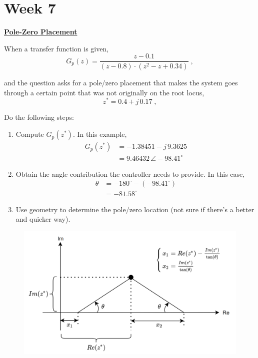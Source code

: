 \section{Week 7}
\textbf{\underline{Pole-Zero Placement}}

When a transfer function is given,
\begin{equation*}
    G_p (z) = \frac{z-0.1}{(z-0.8)\cdot (z^2-z+0.34)} \; ,
\end{equation*}

and the question asks for a pole/zero placement that makes the system goes through a certain point that was not originally on the root locus,
\begin{equation*}
    z^* = 0.4+j\,0.17 \; ,
\end{equation*}

Do the following steps:
\begin{enumerate}
    \item Compute $G_p(z^*)$. In this example,
    \begin{align*}
        G_p(z^*) &= -1.38451 - j\, 9.3625 \\
        &= 9.46432 \, \angle -98.41^{\circ} 
    \end{align*}
    \item Obtain the angle contribution the controller needs to provide. In this case,
    \begin{align*}
        \theta &= -180^{\circ} - (-98.41^{\circ}) \\
        &= -81.58^{\circ} 
    \end{align*}
    \item Use geometry to determine the pole/zero location (not sure if there's a better and quicker way).
\end{enumerate}
\begin{figure}[h]
    \centering
    \includegraphics[width=1.0\linewidth]{images/pole_placement.png}
\end{figure}
    
